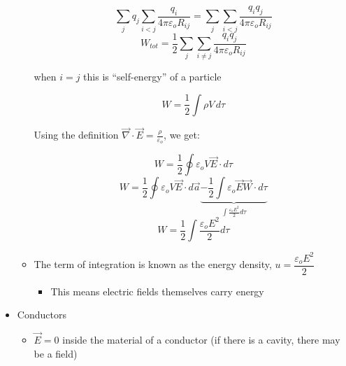 \begin{itemize}
\begin{itemize}
        $$\sum_jq_j\sum_{i<j}\frac{q_i}{4\pi\varepsilon_oR_{ij}}=\sum_j\sum_{i<j}\frac{q_iq_j}{4\pi\varepsilon_oR_{ij}}$$
        $$W_{tot}=\frac{1}{2}\sum_j\sum_{i\neq j}\frac{q_iq_j}{4\pi\varepsilon_oR_{ij}}$$

        when $i=j$ this is ``self-energy'' of a particle

        $$W=\frac{1}{2}\int\rho V\,d\tau$$

        Using the definition $\vec{\nabla}\cdot\vec{E}=\frac{\rho}{\varepsilon_o}$, we get:

        $$W=\frac{1}{2}\oint \varepsilon_o V\vec{E}\cdot d\tau$$
        $$W=\frac{1}{2}\oint \varepsilon_o V\vec{E}\cdot d\vec{a}\underbrace{-\frac{1}{2}\int\varepsilon_o \vec{E}\vec{W}\cdot d\tau}_{\displaystyle \int \frac{\varepsilon_oE^2}{2}d\tau}$$
        $$W=\frac{1}{2}\int \frac{\varepsilon_oE^2}{2}d\tau$$

      \item The term of integration is known as the energy density, $u=\dfrac{\varepsilon_oE^2}{2}$

        \begin{itemize}

          \item This means electric fields themselves carry energy

        \end{itemize}

    \end{itemize}

  \item Conductors

    \begin{itemize}

      \item $\vec{E}=0$ inside the material of a conductor (if there is a cavity, there may be a field)

    \end{itemize}

\end{itemize}



